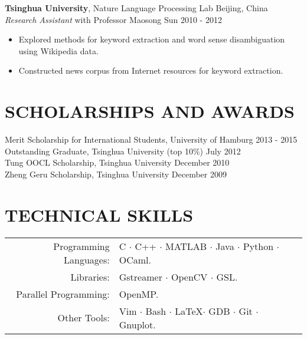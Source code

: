\documentclass[a4paper,11pt]{article} %
\begin{document}

\textbf{Tsinghua University}, Nature Language Processing Lab \hfill Beijing, China \\
\textit{Research Assistant} with Professor Maosong Sun \hfill 2010 - 2012
\vspace{-\parskip}
\begin{itemize}
  \item Explored methods for keyword extraction and word sense disambiguation using Wikipedia data.
  \item Constructed news corpus from Internet resources for keyword extraction.
\end{itemize}


\section{SCHOLARSHIPS AND AWARDS}

Merit Scholarship for International Students, University of Hamburg \hfill 2013 - 2015 \\
Outstanding Graduate, Tsinghua University (top 10\%) \hfill July 2012 \\
Tung OOCL Scholarship, Tsinghua University \hfill December 2010  \\
Zheng Geru Scholarship, Tsinghua University \hfill December 2009


\section{TECHNICAL SKILLS}

\begin{tabular}{rl}
  Programming Languages: & C $\cdotp$ C++ $\cdotp$ MATLAB $\cdotp$ Java $\cdotp$ Python $\cdotp$ OCaml. \\
  Libraries: & Gstreamer $\cdotp$ OpenCV $\cdotp$ GSL. \\
  Parallel Programming: & OpenMP. \\
  Other Tools: & Vim $\cdotp$ Bash $\cdotp$ \LaTeX $\cdotp$ GDB $\cdotp$ Git $\cdotp$ Gnuplot. \\
\end{tabular}
\end{document}
